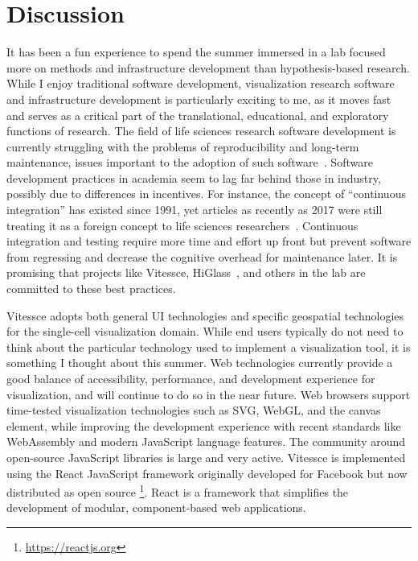 \documentclass[12pt, letterpaper]{article}
\begin{document}
\section{Discussion}
It has been a fun experience to spend the summer immersed in a lab focused more on methods and infrastructure development than hypothesis-based research.
While I enjoy traditional software development, visualization research software and infrastructure development is particularly exciting to me, as it moves fast and serves as a critical part of the translational, educational, and exploratory functions of research.
The field of life sciences research software development is currently struggling with the problems of reproducibility and long-term maintenance, issues important to the adoption of such software~\cite{gruning2018practical,belmann2015bioboxes}.
Software development practices in academia seem to lag far behind those in industry, possibly due to differences in incentives.
For instance, the concept of ``continuous integration'' has existed since 1991, yet articles as recently as 2017 were still treating it as a foreign concept to life sciences researchers~\cite{booch1991object,beaulieu2017reproducibility}.
Continuous integration and testing require more time and effort up front but prevent software from regressing and decrease the cognitive overhead for maintenance later.
It is promising that projects like Vitessce, HiGlass~\cite{kerpedjiev2018higlass}, and others in the lab are committed to these best practices.

Vitessce adopts both general UI technologies and specific geospatial technologies for the single-cell visualization domain.
While end users typically do not need to think about the particular technology used to implement a visualization tool, it is something I thought about this summer.
Web technologies currently provide a good balance of accessibility, performance, and development experience for visualization, and will continue to do so in the near future.
Web browsers support time-tested visualization technologies such as SVG, WebGL, and the canvas element, while improving the development experience with recent standards like WebAssembly and modern JavaScript language features.
The community around open-source JavaScript libraries is large and very active.
Vitessce is implemented using the React JavaScript framework originally developed for Facebook but now distributed as open source \footnote{\url{https://reactjs.org}}.
React is a framework that simplifies the development of modular, component-based web applications.
\end{document}
